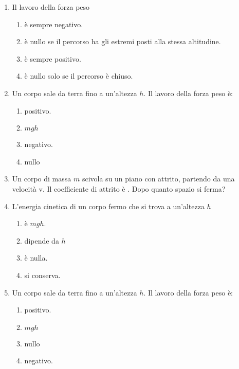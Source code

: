 \documentclass{article}
\begin{document}
\begin{enumerate}
\begin{enumerate}[label=\Alph*.]
  \end{enumerate}
  \item Il lavoro della forza peso
  \begin{enumerate}[label=\Alph*.]
    \item è sempre negativo.
    \item è nullo se il percorso ha gli estremi posti alla stessa altitudine.
    \item è sempre positivo.
    \item è nullo solo se il percorso è chiuso.
  \end{enumerate}
  \item Un corpo sale da terra fino a un'altezza $h$. Il lavoro della forza peso è:
  \begin{enumerate}[label=\Alph*.]
    \item positivo.
    \item $mgh$
    \item negativo.
    \item nullo
  \end{enumerate}
  \item Un corpo di massa $m$ scivola su un piano con attrito, partendo da una velocità v. Il coefficiente di attrito è \mu. Dopo quanto spazio si ferma?
  \begin{enumerate}[label=\Alph*.]
    \item $\frac{1}{2}v^2+\mu g$.
    \item $\frac{v^2}{2g\mu}}$.
    \item $\frac{1}{2}v^2-\mu g$.
    \item $\frac{2v^2}{g\mu}}$.
  \end{enumerate}
  \item L'energia cinetica di un corpo fermo che si trova a un'altezza $h$
  \begin{enumerate}[label=\Alph*.]
    \item è $mgh$.
    \item dipende da $h$
    \item è nulla.
    \item si conserva.
  \end{enumerate}
  \item Un corpo sale da terra fino a un'altezza $h$. Il lavoro della forza peso è:
  \begin{enumerate}[label=\Alph*.]
    \item positivo.
    \item $mgh$
    \item nullo
    \item negativo.

\end{enumerate}
\end{enumerate}
\end{document}

